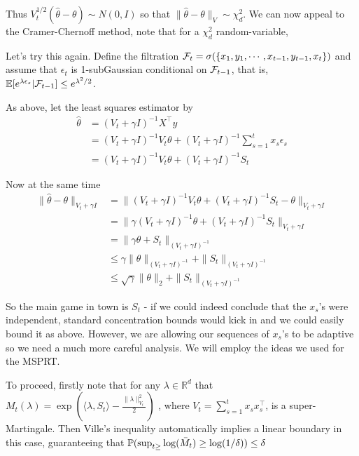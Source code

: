 Thus $V_t^{1/2}(\hat{\theta} - \theta) \sim N(0, I)$ so that $\|\hat{\theta} - \theta\|_{V} \sim \chi^2_d$. We can now appeal to the Cramer-Chernoff method, note that for a $\chi^2_d$ random-variable, 



Let's try this again. Define the filtration $\mc{F}_t = \sigma(\{x_1, y_1, \cdots, x_{t-1}, y_{t-1}, x_t\})$ and assume that $\epsilon_t$ is 1-subGaussian conditional on $\mc{F}_{t-1}$, that is, $\E[e^{\lambda \epsilon_s}|\mc{F}_{t-1}] \leq e^{\lambda^2/2}$. 


As above, let the least squares estimator by 
\begin{align*}
\hat{\theta} 
&= (V_t + \gamma I)^{-1} X^{\top}y  \\
&= (V_t + \gamma I)^{-1} V_t\theta +  (V_t + \gamma I)^{-1} \sum_{s=1}^t x_s\epsilon_s\\
&= (V_t + \gamma I)^{-1} V_t\theta +  (V_t +\gamma I)^{-1}S_t
\end{align*}

Now at the same time
\begin{align*}
\|\hat{\theta} - \theta\|_{V_t + \gamma I}
&= \|(V_t + \gamma I)^{-1} V_t\theta +  (V_t + \gamma I)^{-1}S_t - \theta\|_{V_t + \gamma I}\\
&= \|\gamma (V_t + \gamma I)^{-1} \theta +  (V_t + \gamma I)^{-1}S_t \|_{V_t + \gamma I}\\
&= \|\gamma \theta +  S_t \|_{(V_t + \gamma I)^{-1}}\\
&\leq \gamma\|\theta\|_{(V_t + \gamma I)^{-1}} + \|S_t\|_{(V_t + \gamma I)^{-1}}\\
&\leq \sqrt{\gamma}\|\theta\|_{2} + \|S_t\|_{(V_t + \gamma I)^{-1}}
\end{align*}

So the main game in town is $S_t$ - if we could indeed conclude that the $x_s$'s were independent, standard concentration bounds would kick in and we could easily bound it as above. However, we are allowing our sequences of $x_s$'s to be adaptive so we need a much more careful analysis. We will employ the ideas we used for the MSPRT.

To proceed, firstly note that for any $\lambda\in \mathbb{R}^d$ that $M_t(\lambda) = \exp\left( \langle \lambda, S_t\rangle - \frac{\|\lambda\|_{V_t}^2}{2} \right)$ , 
where $V_t = \sum_{s=1}^t x_s x_s^{\top}$, is a super-Martingale. Then Ville's inequality automatically implies a linear boundary in this case, guaranteeing that $\P(\sup_{t\geq }\log(\bar{M}_t) \geq \log(1/\delta)) \leq \delta$

